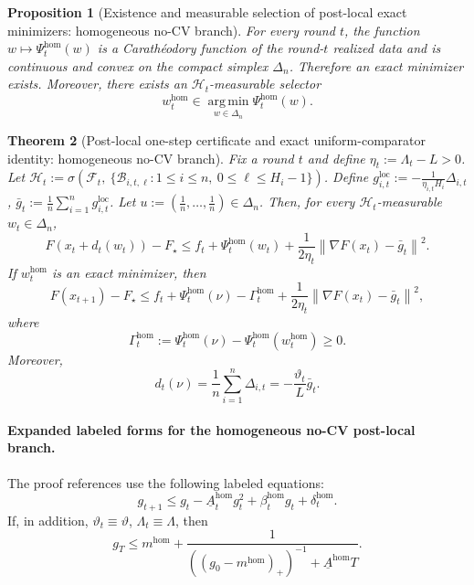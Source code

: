 \documentclass{article}
\newtheorem{theorem}{Theorem}[section]
\newtheorem{proposition}[theorem]{Proposition}
\theoremstyle{definition}
\newcommand{\argmin}{\operatorname*{arg\,min}}
\newcommand{\norm}[1]{\left\lVert #1\right\rVert}
\begin{document}
\begin{proposition}[Existence and measurable selection of post-local exact minimizers: homogeneous no-CV branch]
\label{prop:realized-hom-existence}
For every round $t$, the function $w\mapsto \Psi_t^{\mathrm{hom}}(w)$ is a Carath\'eodory function of the round-$t$ realized data and is continuous and convex on the compact simplex $\Delta_n$. Therefore an exact minimizer exists. Moreover, there exists an $\mathcal H_t$-measurable selector
\[
w_t^{\mathrm{hom}}\in\argmin_{w\in\Delta_n}\Psi_t^{\mathrm{hom}}(w).
\]
\end{proposition}

\begin{theorem}[Post-local one-step certificate and exact uniform-comparator identity: homogeneous no-CV branch]
\label{th:realized-hom-one-step}
Fix a round $t$ and define $
\eta_t:=\Lambda_t-L>0$.
Let $
\mathcal H_t
:=
\sigma\!\left(
\mathcal F_t,\ \{\mathcal B_{i,t,\ell}:1\le i\le n,\ 0\le \ell\le H_i-1\}
\right)$.
Define $
g_{i,t}^{\mathrm{loc}}
:=
-\frac{1}{\eta_{i,t}H_i}\Delta_{i,t}$,
$\bar g_t:=\frac1n\sum_{i=1}^n g_{i,t}^{\mathrm{loc}}$.
Let $
u:=\left(\frac1n,\dots,\frac1n\right)\in\Delta_n$.
Then, for every $\mathcal H_t$-measurable $w_t\in\Delta_n$,
\begin{equation}
F(x_t+d_t(w_t))-F_\star
\le
f_t+\Psi_t^{\mathrm{hom}}(w_t)+\frac{1}{2\eta_t}\norm{\nabla F(x_t)-\bar g_t}^2.
\label{eq:realized-hom-pathwise}\end{equation}
If $w_t^{\mathrm{hom}}$ is an exact minimizer, then
\begin{equation}
F(x_{t+1})-F_\star
\le
f_t+\Psi_t^{\mathrm{hom}}(\nu)-\Gamma_t^{\mathrm{hom}}
+\frac{1}{2\eta_t}\norm{\nabla F(x_t)-\bar g_t}^2,
\label{eq:realized-hom-comp}\end{equation}
where
\[
\Gamma_t^{\mathrm{hom}}
:=
\Psi_t^{\mathrm{hom}}(\nu)-\Psi_t^{\mathrm{hom}}(w_t^{\mathrm{hom}})
\ge 0.
\]
Moreover,
\begin{equation}
d_t(\nu)=\frac1n\sum_{i=1}^n \Delta_{i,t}
=
-\frac{\vartheta_t}{L}\bar g_t.
\label{eq:realized-hom-id}\end{equation}
\end{theorem}

\paragraph{Expanded labeled forms for the homogeneous no-CV post-local branch.}
The proof references use the following labeled equations:
\[
g_{t+1}
\le
g_t-\underline A_t^{\mathrm{hom}}g_t^2+\beta_t^{\mathrm{hom}}g_t+\delta_t^{\mathrm{hom}}.
\]
If, in addition, $
\vartheta_t\equiv \vartheta$, $\Lambda_t\equiv \Lambda$,
then
\[
g_T
\le
m^{\mathrm{hom}}
+
\frac{1}{((g_0-m^{\mathrm{hom}})_+)^{-1}+\underline A^{\mathrm{hom}}T}.
\]
\end{document}
